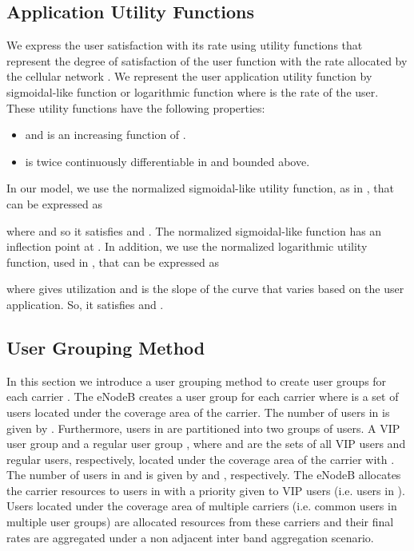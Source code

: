 \documentclass[journal]{IEEEtran} 				\IEEEoverridecommandlockouts 						\usepackage{amsmath,amssymb}
\begin{document}
\subsection{Application Utility Functions}\label{sec:utility functions}
We express the user satisfaction with its rate using utility functions that represent the degree of satisfaction of the user function with the rate allocated by the cellular network \cite{DL_PowerAllocation,Fundamental,Utility-proportional,Ahmed_Utility2}. We represent the  user application utility function  by sigmoidal-like function or logarithmic function where  is the rate of the  user. These utility functions have the following properties:
\begin{itemize}
\item  and  is an increasing function of .
\item  is twice continuously differentiable in  and bounded above.
\end{itemize}

In our model, we use the normalized sigmoidal-like utility function, as in \cite{Ahmed_Utility2}, that can be expressed as

where  and  so it satisfies  and . The normalized sigmoidal-like function has an inflection point at . In addition, we use the normalized logarithmic utility function, used in \cite{Ahmed_Utility1}, that can be expressed as

where  gives  utilization and  is the slope of the curve that varies based on the user application. So, it satisfies  and .
\subsection{User Grouping Method}\label{sec:UsersGrouping}
In this section we introduce a user grouping method to create user groups for each carrier . The eNodeB creates a user group  for each carrier where  is a set of users located under the coverage area of the  carrier. The number of users in  is given by . Furthermore, users in  are partitioned into two groups of users. A VIP user group  and a regular user group , where  and  are the sets of all VIP users and regular users, respectively, located under the coverage area of the  carrier with . The number of users in  and  is given by  and , respectively. The eNodeB allocates the  carrier resources to users in  with a priority given to VIP users (i.e. users in ). Users located under the coverage area of multiple carriers (i.e. common users in multiple user groups) are allocated resources from these carriers and their final rates are aggregated under a non adjacent inter band aggregation scenario.
\end{document}
